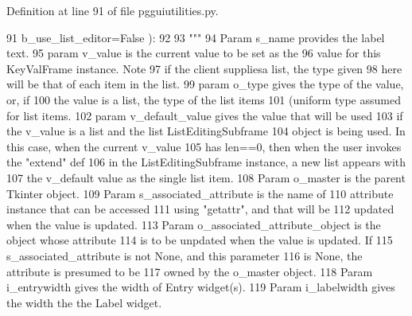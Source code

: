 Definition at line 91 of file pgguiutilities.\+py.


\begin{DoxyCode}
91                     b\_use\_list\_editor=\textcolor{keyword}{False} ):
92         
93         \textcolor{stringliteral}{"""}
94 \textcolor{stringliteral}{        Param s\_name provides the label text.}
95 \textcolor{stringliteral}{        param v\_value is the current value to be set as the}
96 \textcolor{stringliteral}{                value for this KeyValFrame instance.  Note}
97 \textcolor{stringliteral}{                if the client suppliesa list, the type given}
98 \textcolor{stringliteral}{                here will be that of each item in the list.}
99 \textcolor{stringliteral}{        param o\_type gives the type of the value, or, if}
100 \textcolor{stringliteral}{                the value is a list, the type of the list items}
101 \textcolor{stringliteral}{                (uniform type assumed for list items.}
102 \textcolor{stringliteral}{        param v\_default\_value gives the value that will be used}
103 \textcolor{stringliteral}{                if the v\_value is a list and the list ListEditingSubframe}
104 \textcolor{stringliteral}{                object is being used.  In this case, when the current v\_value}
105 \textcolor{stringliteral}{                has len==0, then when the user invokes the "extend" def}
106 \textcolor{stringliteral}{                in the ListEditingSubframe instance, a new list appears with}
107 \textcolor{stringliteral}{                the v\_default value as the single list item.}
108 \textcolor{stringliteral}{        Param o\_master is the parent Tkinter object.}
109 \textcolor{stringliteral}{        Param s\_associated\_attribute is the name of }
110 \textcolor{stringliteral}{            attribute instance that can be accessed}
111 \textcolor{stringliteral}{            using "getattr", and that will be}
112 \textcolor{stringliteral}{            updated when the value is updated.}
113 \textcolor{stringliteral}{        Param o\_associated\_attribute\_object is the object whose attribute}
114 \textcolor{stringliteral}{            is to be unpdated when the value is updated.  If}
115 \textcolor{stringliteral}{            s\_associated\_attribute is not None, and this parameter}
116 \textcolor{stringliteral}{            is None, the attribute is presumed to be}
117 \textcolor{stringliteral}{            owned by the o\_master object.}
118 \textcolor{stringliteral}{        Param i\_entrywidth gives the width of Entry widget(s).}
119 \textcolor{stringliteral}{        Param i\_labelwidth gives the width the the Label widget.}

\end{DoxyCode}
